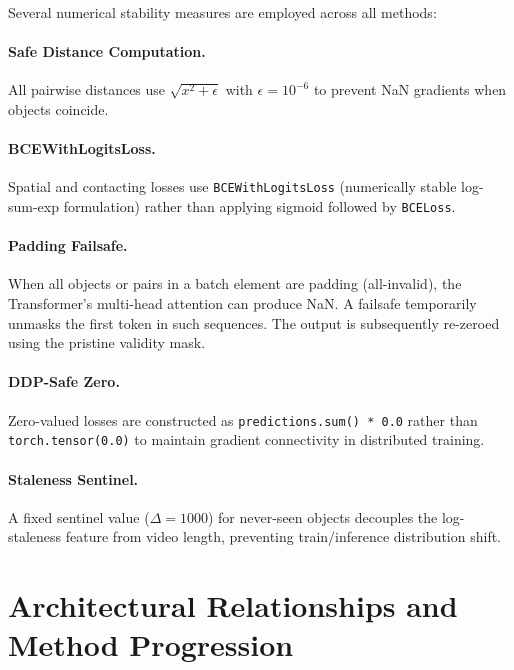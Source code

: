 \documentclass[runningheads]{llncs}
\begin{document}
Several numerical stability measures are employed across all methods:

\paragraph{Safe Distance Computation.}  All pairwise distances use $\sqrt{x^2 + \epsilon}$ with $\epsilon = 10^{-6}$ to prevent NaN gradients when objects coincide.

\paragraph{BCEWithLogitsLoss.}  Spatial and contacting losses use \texttt{BCEWithLogitsLoss} (numerically stable log-sum-exp formulation) rather than applying sigmoid followed by \texttt{BCELoss}.

\paragraph{Padding Failsafe.}  When all objects or pairs in a batch element are padding (all-invalid), the Transformer's multi-head attention can produce NaN.  A failsafe temporarily unmasks the first token in such sequences.  The output is subsequently re-zeroed using the pristine validity mask.

\paragraph{DDP-Safe Zero.}  Zero-valued losses are constructed as \texttt{predictions.sum() * 0.0} rather than \texttt{torch.tensor(0.0)} to maintain gradient connectivity in distributed training.

\paragraph{Staleness Sentinel.}  A fixed sentinel value ($\Delta=1000$) for never-seen objects decouples the log-staleness feature from video length, preventing train/inference distribution shift.


\section{Architectural Relationships and Method Progression}
\label{sec:relationships}
\end{document}
